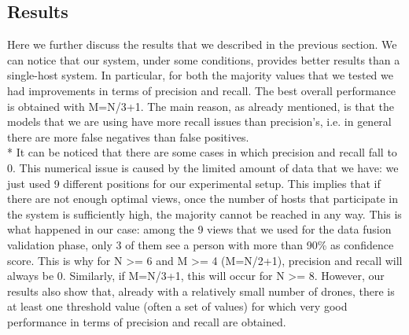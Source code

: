 \documentclass[10pt,conference,compsocconf]{IEEEtran}
\begin{document}
\begin{enumerate}
\section{Results}
\label{sec:results}
Here we further discuss the results that we described in the previous section. We can notice that our system, under some conditions, provides better results than a single-host system. In particular, for both the majority values that we tested we had improvements in terms of precision and recall. The best overall performance is obtained with M=N/3+1. The main reason, as already mentioned, is that the models that we are using have more recall issues than precision's, i.e. in general there are more false negatives than false positives.\\*
It can be noticed that there are some cases in which precision and recall fall to 0. This numerical issue is caused by the limited amount of data that we have: we just used 9 different positions for our experimental setup. This implies that if there are not enough optimal views, once the number of hosts that participate in the system is sufficiently high, the majority cannot be reached in any way. This is what happened in our case: among the 9 views that we used for the data fusion validation phase, only 3 of them see a person with more than 90\% as confidence score. This is why for N \textgreater= 6 and M \textgreater= 4 (M=N/2+1), precision and recall will always be 0. Similarly, if M=N/3+1, this will occur for N \textgreater= 8. However, our results also show that, already with a relatively small number of drones, there is at least one threshold value (often a set of values) for which very good performance in terms of precision and recall are obtained.

\end{enumerate}
\end{document}

